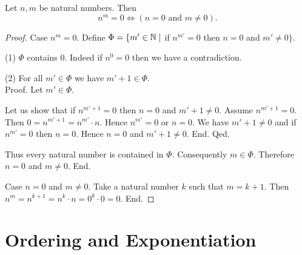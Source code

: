 \documentclass[10pt]{article}
\begin{document}
  \begin{forthel}
    \begin{proposition}
      Let $n, m$ be natural numbers.
      Then \[ n^{m} = 0 \iff (\text{$n = 0$ and $m \neq 0$}). \]
    \end{proposition}
    \begin{proof}
      Case $n^{m} = 0$.
        Define $\Phi = \{ m' \in \mathbb{N} \mid$ if $n^{m'} = 0$ then $n = 0$ and
        $m' \neq 0 \}$.

        (1) $\Phi$ contains $0$.
        Indeed if $n^{0} = 0$ then we have a contradiction.

        (2) For all $m' \in \Phi$ we have $m' + 1 \in \Phi$. \\
        Proof.
          Let $m' \in \Phi$.

          Let us show that if $n^{m' + 1} = 0$ then $n = 0$ and $m' + 1 \neq 0$.
            Assume $n^{m' + 1} = 0$.
            Then $0 = n^{m' + 1} = n^{m'} \cdot n$.
            Hence $n^{m'} = 0$ or $n = 0$.
            We have $m' + 1 \neq 0$ and if $n^{m'} = 0$ then $n = 0$.
            Hence $n = 0$ and $m' + 1 \neq 0$.
          End.
        Qed.

        Thus every natural number is contained in $\Phi$.
        Consequently $m \in \Phi$.
        Therefore $n = 0$ and $m \neq 0$.
      End.

      Case $n = 0$ and $m \neq 0$.
        Take a natural number $k$ such that $m = k + 1$.
        Then $n^{m}
          = n^{k + 1}
          = n^{k} \cdot n
          = 0^{k} \cdot 0
          = 0$.
      End.
    \end{proof}
  \end{forthel}


  \section{Ordering and Exponentiation}
\end{document}
